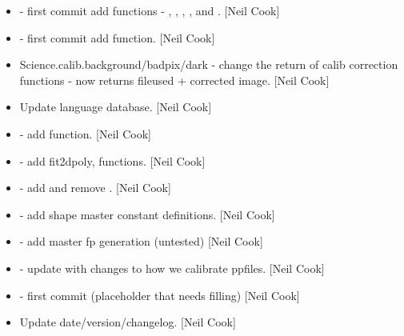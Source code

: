 \documentclass[a4paper,10pt,english]{report}
\begin{document}
\begin{itemize}
\item {} 
 - first commit add  functions -
, , ,
,  and . {[}Neil Cook{]}

\item {} 
 - first commit add  function.
{[}Neil Cook{]}

\item {} 
Science.calib.background/badpix/dark - change the return of calib
correction functions - now returns fileused + corrected image. {[}Neil
Cook{]}

\item {} 
Update language database. {[}Neil Cook{]}

\item {} 
 - add  function. {[}Neil Cook{]}

\item {} 
 - add fit2dpoly,  functions. {[}Neil
Cook{]}

\item {} 
 - add  and remove .
{[}Neil Cook{]}

\item {} 
 - add shape master  constant
definitions. {[}Neil Cook{]}

\item {} 
 - add master fp generation (untested) {[}Neil
Cook{]}

\item {} 
 - update  with changes to how we calibrate
ppfiles. {[}Neil Cook{]}

\item {} 
 - first commit (placeholder that needs
filling) {[}Neil Cook{]}

\item {} 
Update date/version/changelog. {[}Neil Cook{]}

\end{itemize}
\end{document}
